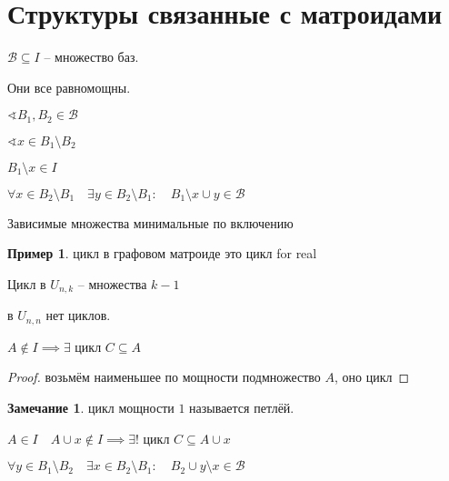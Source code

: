 \documentclass{book}
\theoremstyle{definition}
\newtheorem*{note}{Замечание}
\newtheorem*{example}{Пример}
\begin{document}
\section{Структуры связанные с матроидами}

\begin{definition}
    $\mathcal B\subseteq I$ -- множество баз.

    Они все равномощны.
\end{definition}
\begin{theorem}
$\sphericalangle B_1, B_2\in \mathcal B$

$\sphericalangle x\in B_1\setminus B_2$

$B_1\setminus x\in I$

$\forall x\in B_2\setminus B_1\quad \exists y\in B_2\setminus B_1:\quad B_1\setminus x\cup y\in \mathcal B$
\end{theorem}

\begin{definition}
    Зависимые множества минимальные по включению
\end{definition}

\begin{example}
    цикл в графовом матроиде это цикл for real

    Цикл в $U_{n,k}$ -- множества  $k-1$

    в  $U_{n,n}$ нет циклов.
\end{example}

\begin{lemma}
    $A\not\in I \implies \exists $ цикл $C\subseteq A$
\end{lemma}
\begin{proof}
    возьмём наименьшее по мощности подмножество $A$, оно цикл
\end{proof}

\begin{note}
    цикл мощности $1$ называется петлёй.
\end{note}
\begin{lemma}
        $A\in I\quad A\cup x\not\in I \implies \exists !$ цикл $C\subseteq A\cup x$
\end{lemma}
\begin{theorem}

    $\forall y\in B_1\setminus B_2\quad \exists x\in B_2\setminus B_1:\quad B_2\cup y\setminus x\in \mathcal B$
\end{theorem}
\end{document}
